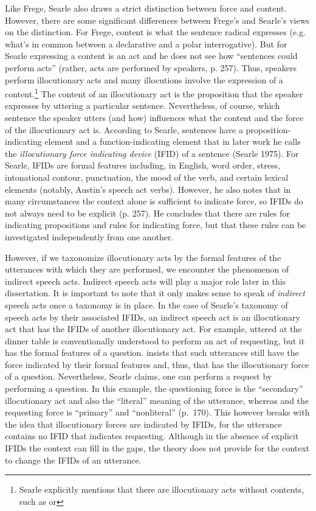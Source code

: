 Like Frege, Searle also draws a strict distinction between force and content. However, there are some significant differences between Frege’s and Searle’s views on the distinction. For Frege, content is what the sentence radical expresses (e.g. what’s in common between a declarative and a polar interrogative). But for Searle expressing a content is an act and he does not see how ``sentences could perform acts'' (rather, acts are performed by speakers, p. 257). Thus, speakers perform illocutionary acts and many illocutions involve the expression of a content.\footnote{Searle explicitly mentions that there are illocutionary acts without contents, such as  or } The content of an illocutionary act is the proposition that the speaker expresses by uttering a particular sentence. Nevertheless, of course, which sentence the speaker utters (and how) influences what the content and the force of the illocutionary act is. According to Searle, sentences have a proposition-indicating element and a function-indicating element that in later work he calls the \emph{illocutionary force indicating device} (IFID) of a sentence (Searle 1975). For Searle, IFIDs are formal features including, in English, word order, stress, intonational contour, punctuation, the mood of the verb, and certain lexical elements (notably, Austin’s speech act verbs). However, he also notes that in many circumstances the context alone is sufficient to indicate force, so IFIDs do not always need to be explicit (p. 257). He concludes that there are rules for indicating propositions and rules for indicating force, but that these rules can be investigated independently from one another. 

However, if we taxonomize illocutionary acts by the formal features of the utterances with which they are performed, we encounter the phenomenon of indirect speech acts. Indirect speech acts will play a major role later in this dissertation. It is important to note that it only makes sense to speak of \emph{indirect} speech acts once a taxonomy is in place. In the case of Searle’s taxonomy of speech acts by their associated IFIDs, an indirect speech act is an illocutionary act that has the IFIDs of another illocutionary act. For example,  uttered at the dinner table is conventionally understood to perform an act of requesting, but it has the formal features of a question. \textcite{searle1975indirect} insists that such utterances still have the force indicated by their formal features and, thus, that  has the illocutionary force of a question. Nevertheless, Searle claims, one can perform a request by performing a question. In this example, the questioning force is the ``secondary'' illocutionary act and also the ``literal'' meaning of the utterance, whereas and the requesting force is ``primary'' and ``nonliteral'' (p.\ 170). This however breaks with the idea that illocutionary forces are indicated by IFIDs, for the utterance contains no IFID that indicates requesting. Although in the absence of explicit IFIDs the context can fill in the gaps, the theory does not provide for the context to change the IFIDs of an utterance. 

